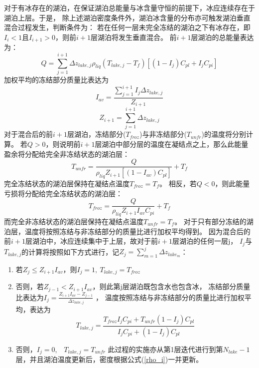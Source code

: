 对于有冰存在的湖泊，在保证湖泊总能量与冰含量守恒的前提下，冰应连续存在于湖泊上层。于是，
除上述湖泊密度条件外，湖泊冰含量的分布亦可触发湖泊垂直混合过程发生，判断条件为：
若在任何一层未完全冻结的湖泊之下有冰存在，即$I_i<1$且$I_{i+1}>0$，则前$i+1$层湖泊将发生垂直混合。
前$i+1$层湖泊的总能量表达为：
\begin{equation}
Q=\sum_{j=1}^{i+1} \Delta z_{lake, j} \rho_{liq}\left(T_{lake, j}-T_{f}\right)\left[\left(1-I_{j}\right) C_{p l}+I_{j} C_{p i}\right]
\end{equation}
加权平均的冻结部分质量比表达为
\begin{equation}
I_{a v}=\frac{\sum_{j=1}^{i+1} I_{j} \Delta z_{lake, j}}{Z_{i+1}}
\end{equation}
\begin{equation}
Z_{i+1}=\sum_{j=1}^{i+1} \Delta z_{lake, j}
\end{equation}
对于混合后的前$i+1$层湖泊，冻结部分($T_{froz}$)与非冻结部分($T_{unfr}$)的温度将分别计算。
若$Q>0$，则说明前$i+1$层湖泊中部分层的温度在凝结点之上，那么此能量盈余将分配给完全非冻结状态的湖泊层：
\begin{equation}
T_{unfr}=\frac{Q}{\rho_{liq} Z_{i+1}\left[\left(1-I_{av}\right) C_{pl}\right]}+T_{f}
\end{equation}
完全冻结状态的湖泊层保持在凝结点温度$T_{froz}=T_f$。
相反，若$Q<0$，则此能量亏损将分配给完全冻结状态的湖泊层：
\begin{equation}
T_{froz}=\frac{Q}{\rho_{liq} Z_{i+1} I_{a v} C_{p i}}+T_{f}
\end{equation}
而完全非冻结状态的湖泊层保持在凝结点温度$T_{unfr}=T_f$。
对于只有部分冻结的湖泊层，温度将按照冻结与非冻结部分的质量比进行加权平均得到。
因为混合后的前$i+1$层湖泊中，冰应连续集中于上层，故对于前$i+1$层湖泊的任何一层j，
$I_j$与$T_{lake,j}$的计算将按照如下方式进行，记${Z_j}=\sum_{m=1}^{j} \Delta z_{lake_m}$：\\
\begin{enumerate}
    \item 若$Z_j\le Z_{i+1}I_{av}$，则$I_j=1,\ T_{lake,j}=T_{froz}$
    \item 否则，若$Z_{j-1}<Z_{i+1} I_{a v}$，则此第j层湖泊既包含水也包含冰，
    冻结部分质量比表达为$I_{j}=\frac{Z_{i+1} I_{a v}-Z_{j-1}}{\Delta z_{lake, j}}$ ，
    温度按照冻结与非冻结部分的质量比进行加权平均，表达为
    \begin{equation}
    T_{lake, j}=\frac{T_{f r o z} I_{j} C_{p i}+T_{u n f r}\left(1-I_{j}\right) C_{p l}}{I_{j} C_{p i}+\left(1-I_{j}\right) C_{p l}}
    \end{equation}
    \item 否则，$I_j=0$,\ \ $T_{lake,j}=T_{unfr}$
    此过程的实施亦从第1层迭代进行到第$N_{lake}-1$层，并且湖泊温度更新后，密度根据公式(\ref{rho_i})一并更新。
\end{enumerate}
